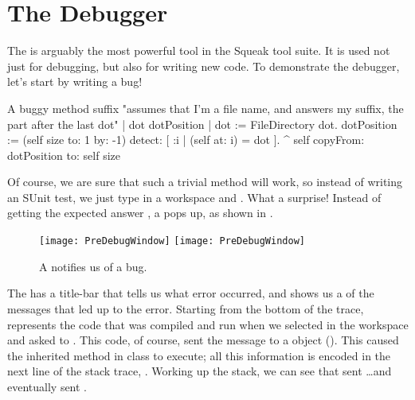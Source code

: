 \documentclass[a4paper,10pt,twoside]{book}
\begin{document}
\section{The Debugger}
\label{sec:debugger} %

The  is arguably the most powerful tool in the Squeak tool suite.  It is used not just for debugging, but also for writing new code.
To demonstrate the debugger, let's start by writing a bug!


\needspace{10ex}
\begin{method}[buggy]{A buggy method}
suffix
	"assumes that I'm a file name, and answers my suffix, the part after the last dot"
	| dot dotPosition |
	dot := FileDirectory dot.
	dotPosition := (self size to: 1 by: -1) detect: [ :i | (self at: i) = dot ].
	^ self copyFrom: dotPosition to: self size 
\end{method}

Of course, we are sure that such a trivial method will work, so instead of writing an SUnit test, we just type
 in a workspace and .
What a surprise!  Instead of getting the expected answer , a  pops up, as shown in .

\begin{figure}[btp]
	\begin{center}
	\ifluluelse
		{\texttt{[image: PreDebugWindow]}}
		{\texttt{[image: PreDebugWindow]}}
	\end{center}
	\caption{A  notifies us of a bug.}
	\label{fig:PreDebugWindow}
\end{figure}

The  has a title-bar that tells us what error occurred, and shows us a  of the messages that led up to the error. 
Starting from the bottom of the trace,  represents the code that was compiled and run when we selected  in the workspace and asked \sq to .
This code, of course, sent the message  to a  object (). 
This caused the inherited  method in class  to execute; all this information is encoded in the next line of the stack trace, .  
Working up the stack, we can see that  sent \ldots and eventually  sent .
\end{document}
